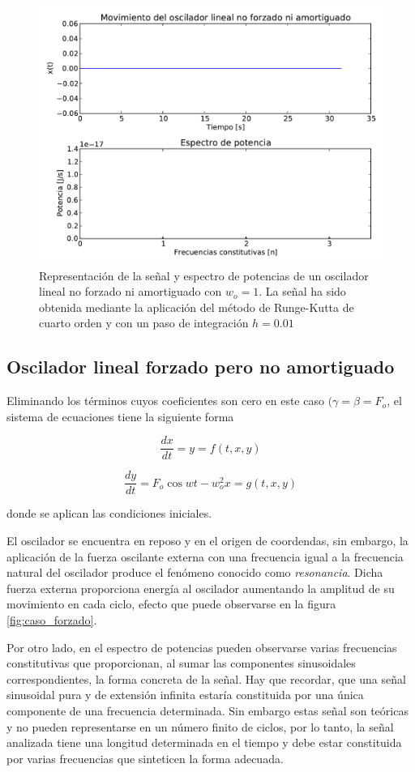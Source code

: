 \documentclass[11pt]{article}
\begin{document}
\begin{figure}
\centering
\includegraphics[width=0.75\linewidth]{caso_lineal.pdf}
\caption{Representación de la señal y espectro de potencias de un oscilador
lineal no forzado ni amortiguado con $w_o = 1$. La señal ha sido obtenida
mediante la aplicación del método de Runge-Kutta de cuarto orden y con un paso
de integración $h = 0.01$}
\label{fig:caso_lineal}
\end{figure}

\subsection{Oscilador lineal forzado pero no amortiguado}
Eliminando los términos cuyos coeficientes son cero en este caso
$(\gamma = \beta = F_o$, el sistema de ecuaciones tiene la siguiente forma

\begin{equation}
	\frac{dx}{dt} = y = f(t, x, y)
\end{equation}

\begin{equation}
	\frac{dy}{dt} = F_o\cos{wt} - w_o^2 x = g(t, x, y) 	
\end{equation}

donde se aplican las condiciones iniciales. 

El oscilador se encuentra en reposo y en el origen de coordendas, sin embargo,
la aplicación de la fuerza oscilante externa con una frecuencia igual a la
frecuencia natural del oscilador produce el fenómeno conocido como
\textit{resonancia}. Dicha fuerza externa proporciona energía al oscilador
aumentando la amplitud de su movimiento en cada ciclo, efecto que puede
observarse en la figura \ref{fig:caso_forzado}.

Por otro lado, en el espectro de potencias pueden observarse varias frecuencias
constitutivas que proporcionan, al sumar las componentes sinusoidales
correspondientes, la forma concreta de la señal. Hay que recordar, que una señal
sinusoidal pura y de extensión infinita estaría constituida por una única
componente de una frecuencia determinada. Sin embargo estas señal son teóricas y
no pueden representarse en un número finito de ciclos, por lo tanto, la señal
analizada tiene una longitud determinada en el tiempo y debe estar constituida
por varias frecuencias que sinteticen la forma adecuada.
\end{document}

